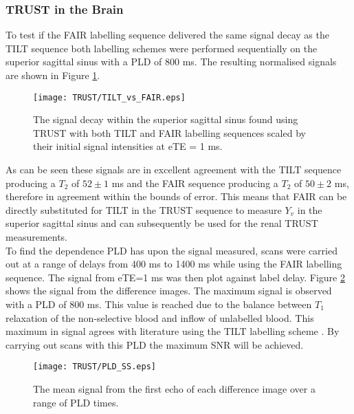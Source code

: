 \subsubsection{\ac{TRUST} in the Brain}

To test if the \ac{FAIR} labelling sequence delivered the same signal decay as the \ac{TILT} sequence both labelling schemes were performed sequentially on the superior sagittal sinus with a \ac{PLD} of 800 ms. The resulting normalised signals are shown in Figure \ref{fig:TILT_vs_FAIR}.
\begin{figure}[H]
	\centering
	\texttt{[image: TRUST/TILT\_vs\_FAIR.eps]}
	\caption{The signal decay within the superior sagittal sinus found using \ac{TRUST} with both \ac{TILT} and \ac{FAIR} labelling sequences scaled by their initial signal intensities at eTE = 1 ms.}
	\label{fig:TILT_vs_FAIR}	
\end{figure}

As can be seen these signals are in excellent agreement with the \ac{TILT} sequence producing a $T_2$ of $52\pm1$ ms and the \ac{FAIR} sequence producing a $T_2$ of $50\pm2$ ms, therefore in agreement within the bounds of error. This means that \ac{FAIR} can be directly substituted for \ac{TILT} in the \ac{TRUST} sequence to measure $Y_v$ in the superior sagittal sinus and can subsequently be used for the renal \ac{TRUST} measurements.\\

To find the dependence \ac{PLD} has upon the signal measured, scans were carried out at a range of delays from 400 ms to 1400 ms while using the \ac{FAIR} labelling sequence. The signal from \ac{eTE}=1 ms was then plot against label delay. Figure \ref{fig:Sig_vs_PLD_SS} shows the signal from the difference images. The maximum signal is observed with a \ac{PLD} of 800 ms. This value is reached due to the balance between $T_1$ relaxation of the non-selective blood and inflow of unlabelled blood. This maximum in signal agrees with literature using the \ac{TILT} labelling scheme \cite{lu_quantitative_2008}. By carrying out scans with this \ac{PLD} the maximum \ac{SNR} will be achieved.\\ 

\begin{figure}[H]
	\centering
	\texttt{[image: TRUST/PLD\_SS.eps]}
	\caption{The mean signal from the first echo of each difference image over a range of \ac{PLD} times.}
	\label{fig:Sig_vs_PLD_SS}	
\end{figure}

